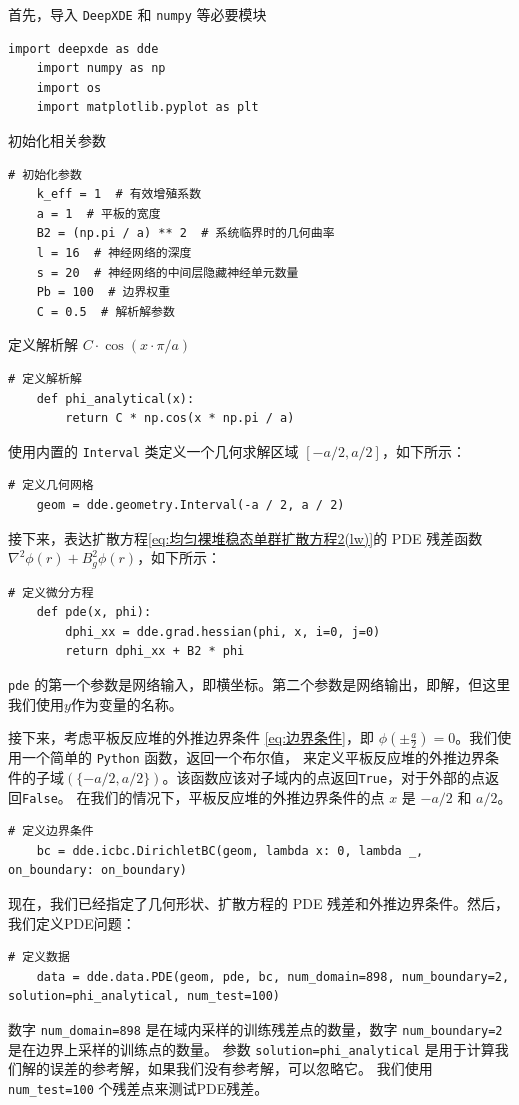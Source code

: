 \documentclass{Sichuan Normal University}
\begin{document}
\noindent 首先，导入 \texttt{DeepXDE} 和 \texttt{numpy} 等必要模块
\begin{lstlisting}[style=python,basicstyle=\footnotesize\fontspec{Courier New},]  
    import deepxde as dde
    import numpy as np
    import os
    import matplotlib.pyplot as plt
\end{lstlisting}
初始化相关参数
\begin{lstlisting}[style=python,basicstyle=\footnotesize\fontspec{Courier New},]  
    # 初始化参数
    k_eff = 1  # 有效增殖系数
    a = 1  # 平板的宽度
    B2 = (np.pi / a) ** 2  # 系统临界时的几何曲率
    l = 16  # 神经网络的深度
    s = 20  # 神经网络的中间层隐藏神经单元数量
    Pb = 100  # 边界权重
    C = 0.5  # 解析解参数
\end{lstlisting}
定义解析解 $C\cdot\cos(x\cdot\pi/a)$
\begin{lstlisting}[style=python,basicstyle=\footnotesize\fontspec{Courier New},]  
    # 定义解析解
    def phi_analytical(x):
        return C * np.cos(x * np.pi / a)    
\end{lstlisting}
使用内置的 \texttt{Interval} 类定义一个几何求解区域 $[-a/2,a/2]$，如下所示：
\begin{lstlisting}[style=python,basicstyle=\footnotesize\fontspec{Courier New},]  
    # 定义几何网格
    geom = dde.geometry.Interval(-a / 2, a / 2)    
\end{lstlisting}
接下来，表达扩散方程\eqref{eq:均匀裸堆稳态单群扩散方程2(lw)}的 PDE 残差函数$\nabla^2 \phi(r)+B_g^2 \phi(r)$，如下所示：

\begin{lstlisting}[style=python,basicstyle=\footnotesize\fontspec{Courier New},]  
    # 定义微分方程
    def pde(x, phi):
        dphi_xx = dde.grad.hessian(phi, x, i=0, j=0)
        return dphi_xx + B2 * phi
\end{lstlisting}
\texttt{pde} 的第一个参数是网络输入，即横坐标。第二个参数是网络输出，即解，但这里我们使用$y$作为变量的名称。

接下来，考虑平板反应堆的外推边界条件 \eqref{eq:边界条件}，即 $\phi(\pm\frac{a}{2})=0$。我们使用一个简单的 \texttt{Python} 函数，返回一个布尔值，
来定义平板反应堆的外推边界条件的子域$(\{-a/2,a/2\})$。该函数应该对子域内的点返回\texttt{True}，对于外部的点返回\texttt{False}。
在我们的情况下，平板反应堆的外推边界条件的点 $x$ 是 $-a/2$ 和 $a/2$。
\begin{lstlisting}[style=python,basicstyle=\footnotesize\fontspec{Courier New},]  
    # 定义边界条件
    bc = dde.icbc.DirichletBC(geom, lambda x: 0, lambda _, on_boundary: on_boundary)
\end{lstlisting}
现在，我们已经指定了几何形状、扩散方程的 PDE 残差和外推边界条件。然后，我们定义PDE问题：
\begin{lstlisting}[style=python,basicstyle=\footnotesize\fontspec{Courier New},]  
    # 定义数据
    data = dde.data.PDE(geom, pde, bc, num_domain=898, num_boundary=2, solution=phi_analytical, num_test=100)
\end{lstlisting}
数字 \texttt{num\_domain=898} 是在域内采样的训练残差点的数量，数字 \texttt{num\_boundary=2} 是在边界上采样的训练点的数量。
参数 \texttt{solution=phi\_analytical} 是用于计算我们解的误差的参考解，如果我们没有参考解，可以忽略它。
我们使用 \texttt{num\_test=100} 个残差点来测试PDE残差。
\end{document}
